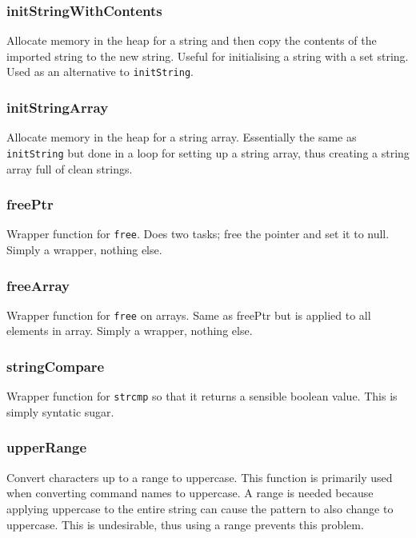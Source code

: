 \documentclass[a4paper, 12pt, titlepage]{article}
\newcommand{\code}[1]{\small\texttt{#1}\normalsize}
\begin{document}
\subsubsection{initStringWithContents}

Allocate memory in the heap for a string and then copy the contents of the 
imported string to the new string. Useful for initialising a string with a
set string. Used as an alternative to \code{initString}.

\subsubsection{initStringArray}

Allocate memory in the heap for a string array. Essentially the same as 
\code{initString} but done in a loop for setting up a string array, thus 
creating a string array full of clean strings.

\subsubsection{freePtr}

Wrapper function for \code{free}. Does two tasks; free the pointer and 
set it to null. Simply a wrapper, nothing else.

\subsubsection{freeArray}

Wrapper function for \code{free} on arrays. Same as freePtr but is applied 
to all elements in array. Simply a wrapper, nothing else.

\subsubsection{stringCompare}

Wrapper function for \code{strcmp} so that it returns a sensible boolean 
value. This is simply syntatic sugar.

\subsubsection{upperRange}

Convert characters up to a range to uppercase. This function is primarily 
used when converting command names to uppercase. A range is needed because 
applying uppercase to the entire string can cause the pattern to also change 
to uppercase. This is undesirable, thus using a range prevents this problem.
\end{document}
